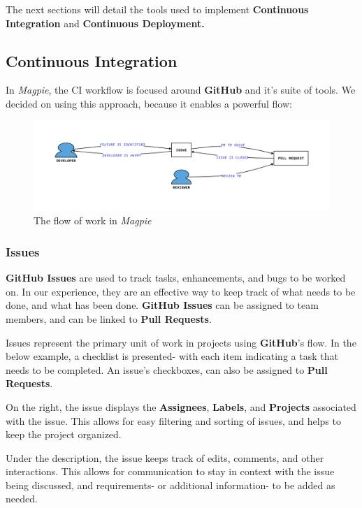 The next sections will detail the tools used to implement
\textbf{Continuous Integration} and \textbf{Continuous Deployment.}

\newpage{}

\subsection{Continuous Integration}
\label{sec:continuous_integration}
In \textit{Magpie}, the CI workflow is focused around \textbf{GitHub} and it's
suite of tools. We decided on using this approach, because it enables a powerful
flow:

\begin{figure}[htbp]
    \centering{}
    \includegraphics[width=\textwidth]{../d2-diagrams/issues-prs/diagram.png}
    \caption{The flow of work in \textit{Magpie}}
\end{figure}

\subsubsection{Issues}
\label{sec:github_issues}
\textbf{GitHub Issues} are used to track tasks, enhancements, and bugs to be
worked on. In our experience, they are an effective way to keep track of what
needs to be done, and what has been done. \textbf{GitHub Issues} can be assigned
to team members, and can be linked to \textbf{Pull Requests}.

Issues represent the primary unit of work in projects using \textbf{GitHub}'s
flow. In the below example, a checklist is presented- with each item indicating
a task that needs to be completed. An issue's checkboxes, can also be assigned
to \textbf{Pull Requests}.

On the right, the issue displays the \textbf{Assignees}, \textbf{Labels}, and
\textbf{Projects} associated with the issue. This allows for easy filtering and
sorting of issues, and helps to keep the project organized.

Under the description, the issue keeps track of edits, comments, and other
interactions. This allows for communication to stay in context with the issue
being discussed, and requirements- or additional information- to be added as
needed.

